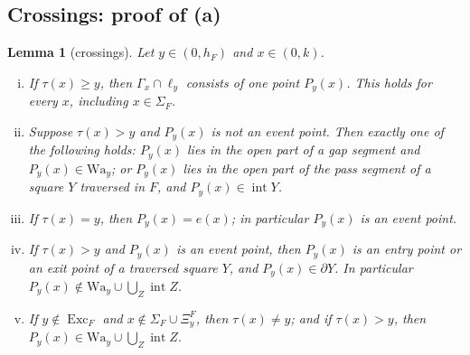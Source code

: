 \documentclass[11pt]{amsart}
\newcommand{\Exc}{\operatorname{Exc}}
\newtheorem{lemma}[theorem]{Lemma}
\theoremstyle{definition}
\theoremstyle{remark}
\numberwithin{equation}{section}
\begin{document}
\subsection{Crossings: proof of (a)}\label{ssec:P4-a}

\begin{lemma}[crossings]\label{lem:P4-crossing}
Let $y\in(0,h_F)$ and $x\in(0,k)$.
\begin{enumerate}[(i)]
\item If $\tau(x)\ge y$, then $\Gamma_x\cap\ell_y$ consists of one point $P_y(x)$. This holds for every $x$, including $x\in\Sigma_F$.
\item Suppose $\tau(x)>y$ and $P_y(x)$ is not an event point. Then exactly one of the following holds: $P_y(x)$ lies in the open part of a gap segment and $P_y(x)\in\mathrm{Wa}_y$; or $P_y(x)$ lies in the open part of the pass segment of a square $Y$ traversed in $F$, and $P_y(x)\in\operatorname{int}Y$.
\item If $\tau(x)=y$, then $P_y(x)=e(x)$; in particular $P_y(x)$ is an event point.
\item If $\tau(x)>y$ and $P_y(x)$ is an event point, then $P_y(x)$ is an entry point or an exit point of a traversed square $Y$, and $P_y(x)\in\partial Y$. In particular $P_y(x)\notin\mathrm{Wa}_y\cup\bigcup_Z\operatorname{int}Z$.
\item If $y\notin\Exc_F$ and $x\notin\Sigma_F\cup\Xi^F_y$, then $\tau(x)\ne y$; and if $\tau(x)>y$, then $P_y(x)\in\mathrm{Wa}_y\cup\bigcup_Z\operatorname{int}Z$.
\end{enumerate}
\end{lemma}
\end{document}
